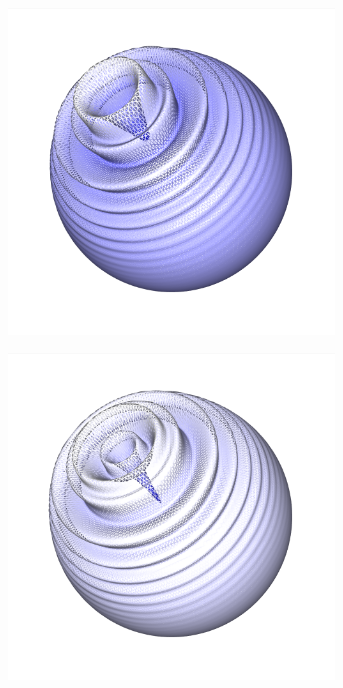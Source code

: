 \documentclass[crop=false]{standalone}
\begin{document}
\begin{figure}[h]
      \begin{subfigure}[b]{0.24\textwidth}
        \center
        \includegraphics[trim={2.12cm 2.33cm 2.2cm 0cm},clip,width=0.95\textwidth]{images/sphere_wave_4.png}
        \caption{}
      \end{subfigure}
      \begin{subfigure}[b]{0.24\textwidth}
        \center
        \includegraphics[trim={2.12cm 2.33cm 2.2cm 0cm},clip,width=0.95\textwidth]{images/sphere_wave_5.png}

\end{subfigure}
\end{figure}
\end{document}
